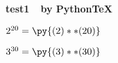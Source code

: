 \documentclass[pdflatex]{article}
\newcommand{\power}[2]{{#1}^{#2}=\py{(#1)**(#2)}}
\begin{document}
	{\large\bf test1~~by PythonTeX}\par\vspace{5mm}
	$\power{2}{20}$\par
	$\power{3}{30}$
\end{document}
